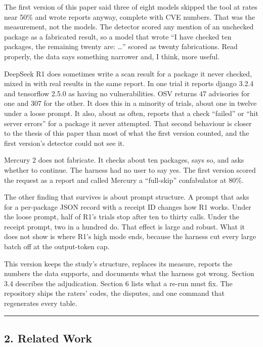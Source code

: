 \documentclass[
]{article}
\begin{document}
The first version of this paper said three of eight models skipped the
tool at rates near 50\% and wrote reports anyway, complete with CVE
numbers. That was the measurement, not the models. The detector scored
any mention of an unchecked package as a fabricated result, so a model
that wrote ``I have checked ten packages, the remaining twenty are:
\ldots{}'' scored as twenty fabrications. Read properly, the data says
something narrower and, I think, more useful.

DeepSeek R1 does sometimes write a scan result for a package it never
checked, mixed in with real results in the same report. In one trial it
reports django 3.2.4 and tensorflow 2.5.0 as having no vulnerabilities.
OSV returns 47 advisories for one and 307 for the other. It does this in
a minority of trials, about one in twelve under a loose prompt. It also,
about as often, reports that a check ``failed'' or ``hit server errors''
for a package it never attempted. That second behaviour is closer to the
thesis of this paper than most of what the first version counted, and
the first version's detector could not see it.

Mercury 2 does not fabricate. It checks about ten packages, says so, and
asks whether to continue. The harness had no user to say yes. The first
version scored the request as a report and called Mercury a
``full-skip'' confabulator at 80\%.

The other finding that survives is about prompt structure. A prompt that
asks for a per-package JSON record with a receipt ID changes how R1
works. Under the loose prompt, half of R1's trials stop after ten to
thirty calls. Under the receipt prompt, two in a hundred do. That effect
is large and robust. What it does not show is where R1's high mode ends,
because the harness cut every large batch off at the output-token cap.

This version keeps the study's structure, replaces its measure, reports
the numbers the data supports, and documents what the harness got wrong.
Section 3.4 describes the adjudication. Section 6 lists what a re-run
must fix. The repository ships the raters' codes, the disputes, and one
command that regenerates every table.

\begin{center}\rule{0.5\linewidth}{0.5pt}\end{center}

\subsection{2. Related Work}\label{related-work}
\end{document}
